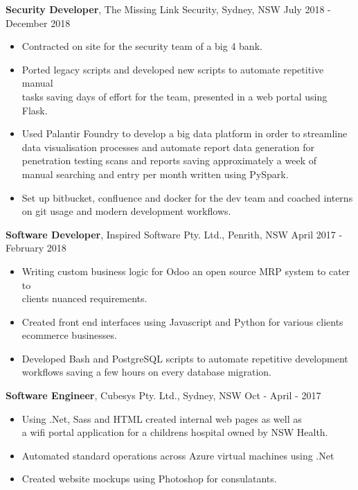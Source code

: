 \documentclass[margin]{res}
\begin{document}
\begin{resume}
{\bf Security Developer}, 
	The Missing Link Security, Sydney, NSW \hfill July 2018 - December 2018
\begin{itemize} \itemsep 0pt  %
\item Contracted on site for the security team of a big 4 bank.
\item Ported legacy scripts and developed new scripts to automate repetitive manual \\
	tasks saving days of effort for the team, presented in a web portal using Flask. 
\item Used Palantir Foundry to develop a big data platform in order to streamline \\
	data visualisation processes and automate report data generation for \\
		penetration testing scans and reports saving approximately a week of \\
		manual searching and entry per month written using PySpark.
\item Set up bitbucket, confluence and docker for the dev team and coached interns \\
	on git usage and modern development workflows.
\end{itemize}

{\bf Software Developer}, 
	Inspired Software Pty. Ltd., Penrith, NSW \hfill April 2017 - February 2018
\begin{itemize} \itemsep 0pt  %
\item Writing custom business logic for Odoo an open source MRP system to cater to \\
	clients nuanced requirements.

\item  Created front end interfaces using Javascript and Python for various clients \\
	ecommerce businesses.

\item Developed Bash and PostgreSQL scripts to automate repetitive development \\
	workflows saving a few hours on every database migration.
\end{itemize}

 {\bf Software Engineer}, 
	Cubesys Pty. Ltd., Sydney, NSW \hfill Oct - April - 2017
 \begin{itemize} \itemsep 0pt  %
 \item Using .Net, Sass and HTML created internal web pages as well as \\
	 a wifi portal application for a childrens hospital owned by NSW Health.
 \item Automated standard operations across Azure virtual machines using .Net
 \item Created website mockups using Photoshop for consulatants.
 \end{itemize}


\end{resume}
\end{document}
